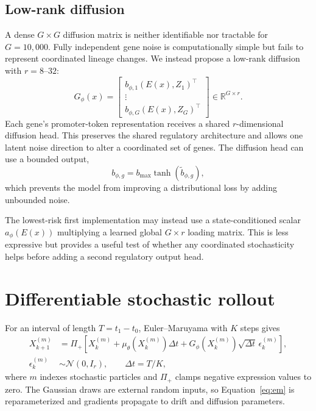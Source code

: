 \documentclass[11pt]{article}
\newcommand{\R}{\mathbb{R}}
\newcommand{\N}{\mathcal{N}}
\begin{document}
\subsection{Low-rank diffusion}

A dense $G\times G$ diffusion matrix is neither identifiable nor tractable for
$G=10{,}000$. Fully independent gene noise is computationally simple but fails
to represent coordinated lineage changes. We instead propose a low-rank
diffusion with $r=8$--$32$:
\begin{equation}
  G_\phi(x)
  =
  \begin{bmatrix}
    b_{\phi,1}(E(x),Z_1)^\top \\
    \vdots \\
    b_{\phi,G}(E(x),Z_G)^\top
  \end{bmatrix}
  \in \R^{G\times r}.
  \label{eq:lowrank}
\end{equation}
Each gene's promoter-token representation receives a shared $r$-dimensional
diffusion head. This preserves the shared regulatory architecture and allows
one latent noise direction to alter a coordinated set of genes. The diffusion
head can use a bounded output,
\begin{equation}
  b_{\phi,g}=b_{\max}\tanh(\widetilde b_{\phi,g}),
\end{equation}
which prevents the model from improving a distributional loss by adding
unbounded noise.

The lowest-risk first implementation may instead use a state-conditioned
scalar $a_\phi(E(x))$ multiplying a learned global $G\times r$ loading matrix.
This is less expressive but provides a useful test of whether any coordinated
stochasticity helps before adding a second regulatory output head.

\section{Differentiable stochastic rollout}

For an interval of length $T=t_1-t_0$, Euler--Maruyama with $K$ steps gives
\begin{align}
  X^{(m)}_{k+1}
  &= \Pi_+\!\left[
       X^{(m)}_k
       + \mu_\theta(X^{(m)}_k)\Delta t
       + G_\phi(X^{(m)}_k)\sqrt{\Delta t}\,
         \epsilon^{(m)}_k
     \right], \\
  \epsilon^{(m)}_k &\sim \N(0,I_r),
  \qquad \Delta t=T/K,
  \label{eq:em}
\end{align}
where $m$ indexes stochastic particles and $\Pi_+$ clamps negative expression
values to zero. The Gaussian draws are external random inputs, so
Equation~\ref{eq:em} is reparameterized and gradients propagate to drift and
diffusion parameters.
\end{document}
